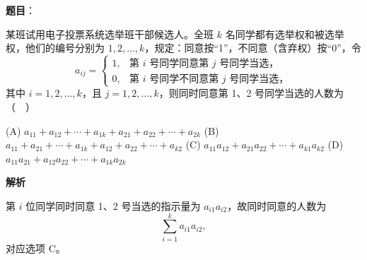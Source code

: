 \begin{answer}

\textbf{题目}：

某班试用电子投票系统选举班干部候选人。全班 \(k\) 名同学都有选举权和被选举权，他们的编号分别为 \(1,2,\ldots,k\)，规定：同意按“1”，不同意（含弃权）按“0”，令
\nopagebreak[4]
\[
a_{ij}=\begin{cases}
1,&\text{第 }i\text{ 号同学同意第 }j\text{ 号同学当选，}\\
0,&\text{第 }i\text{ 号同学不同意第 }j\text{ 号同学当选，}
\end{cases}
\]
其中 \(i=1,2,\ldots,k\)，且 \(j=1,2,\ldots,k\)，则同时同意第 1、2 号同学当选的人数为（　）

    (A) \(a_{11}+a_{12}+\cdots+a_{1k}+a_{21}+a_{22}+\cdots+a_{2k}\)
    (B) \(a_{11}+a_{21}+\cdots+a_{1k}+a_{12}+a_{22}+\cdots+a_{k2}\)
    (C) \(a_{11}a_{12}+a_{21}a_{22}+\cdots+a_{k1}a_{k2}\)
    (D) \(a_{11}a_{21}+a_{12}a_{22}+\cdots+a_{1k}a_{2k}\)

\textbf{解析}

第 \(i\) 位同学同时同意 1、2 号当选的指示量为 \(a_{i1}a_{i2}\)，故同时同意的人数为
\nopagebreak[4]
\[
\sum_{i=1}^k a_{i1}a_{i2},
\]
对应选项 C。


\end{answer}

